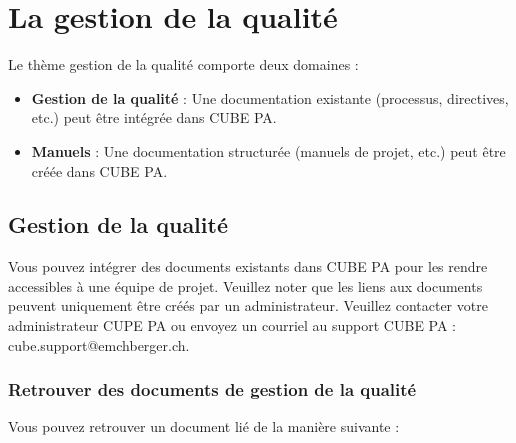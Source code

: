 
\pagebreak
\section{La gestion de la qualité}

Le thème gestion de la qualité comporte deux domaines : 

\vspace{\baselineskip}

\begin{itemize}
\item
\textbf{Gestion de la qualité} : Une documentation existante (processus, directives, etc.) peut être intégrée dans CUBE PA.
\item
\textbf{Manuels} : Une documentation structurée (manuels de projet, etc.) peut être créée dans CUBE PA.
\end{itemize}

\vspace{\baselineskip}

\subsection{Gestion de la qualité}

Vous pouvez intégrer des documents existants dans CUBE PA pour les rendre accessibles à une équipe de projet. Veuillez noter que les liens aux documents peuvent uniquement être créés par un administrateur. Veuillez contacter votre administrateur CUPE PA ou envoyez un courriel au support CUBE PA : {\color{red} cube.support@emchberger.ch}.

\subsubsection{Retrouver des documents de gestion de la qualité}

Vous pouvez retrouver un document lié de la manière suivante :

\vspace{\baselineskip}

